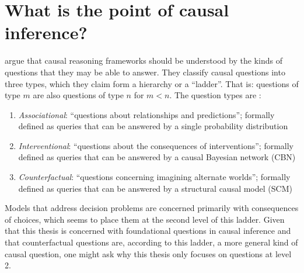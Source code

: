 \section{What is the point of causal inference?}\label{sec:whats_the_point}

\citet{pearl_book_2018} argue that causal reasoning frameworks should be understood by the kinds of questions that they may be able to answer. They classify causal questions into three types, which they claim form a hierarchy or a ``ladder''. That is: questions of type $m$ are also questions of type $n$ for $m<n$. The question types are \citep{barenboim_foundations_2020}:
\begin{enumerate}
    \item \emph{Associational}: ``questions about relationships and predictions''; formally defined as queries that can be answered by a single probability distribution
    \item \emph{Interventional}: ``questions about the consequences of interventions''; formally defined as queries that can be answered by a causal Bayesian network (CBN)
    \item \emph{Counterfactual}: ``questions concerning imagining alternate worlds''; formally defined as queries that can be answered by a structural causal model (SCM)
\end{enumerate}

Models that address decision problems are concerned primarily with consequences of choices, which seems to place them at the second level of this ladder. Given that this thesis is concerned with foundational questions in causal inference and that counterfactual questions are, according to this ladder, a more general kind of causal question, one might ask why this thesis only focuses on questions at level 2. 

